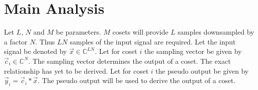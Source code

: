 \documentclass[a4paper, openany, oneside]{memoir}
\begin{document}
\section{Main Analysis}

Let $L$, $N$ and $M$ be parameters. $M$ cosets will provide $L$ samples downsampled by a factor $N$. Thus $LN$ samples of the input signal are required. Let the input signal be denoted by $\vec{x} \in \mathbb{C}^{LN}$. Let for coset $i$ the sampling vector be given by $\vec{c}_i \in \mathbb{C}^{N}$. The sampling vector determines the output of a coset. The exact relationship has yet to be derived. Let for coset $i$ the pseudo output be given by $\vec{y}_i = \vec{c}_i \ast \vec{x}$. The pseudo output will be used to derive the output of a coset.

\begin{blockTheorem} \label{th:conv-corr}
\end{blockTheorem}
\end{document}
